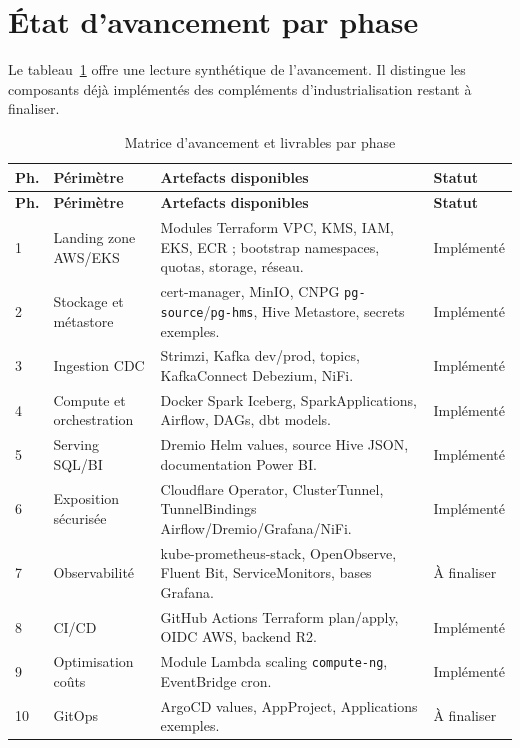 \section{État d'avancement par phase}

Le tableau~\ref{tab:avancement} offre une lecture synthétique de l'avancement. Il distingue les composants déjà implémentés des compléments d'industrialisation restant à finaliser.

\begin{longtable}{@{}p{}p{}p{}p{}@{}}
\caption{Matrice d'avancement et livrables par phase}
\label{tab:avancement}\\
\toprule
\textbf{Ph.} & \textbf{Périmètre} & \textbf{Artefacts disponibles} & \textbf{Statut} \\
\midrule
\endfirsthead
\toprule
\textbf{Ph.} & \textbf{Périmètre} & \textbf{Artefacts disponibles} & \textbf{Statut} \\
\midrule
\endhead
1 & Landing zone AWS/EKS & Modules Terraform VPC, KMS, IAM, EKS, ECR ; bootstrap namespaces, quotas, storage, réseau. & Implémenté \\
2 & Stockage et métastore & cert-manager, MinIO, CNPG \texttt{pg-source}/\texttt{pg-hms}, Hive Metastore, secrets exemples. & Implémenté \\
3 & Ingestion CDC & Strimzi, Kafka dev/prod, topics, KafkaConnect Debezium, NiFi. & Implémenté \\
4 & Compute et orchestration & Docker Spark Iceberg, SparkApplications, Airflow, DAGs, dbt models. & Implémenté \\
5 & Serving SQL/BI & Dremio Helm values, source Hive JSON, documentation Power BI. & Implémenté  \\
6 & Exposition sécurisée & Cloudflare Operator, ClusterTunnel, TunnelBindings Airflow/Dremio/Grafana/NiFi. & Implémenté  \\
7 & Observabilité & kube-prometheus-stack, OpenObserve, Fluent Bit, ServiceMonitors, bases Grafana. & À finaliser \\
8 & CI/CD & GitHub Actions Terraform plan/apply, OIDC AWS, backend R2. & Implémenté \\
9 & Optimisation coûts & Module Lambda scaling \texttt{compute-ng}, EventBridge cron. & Implémenté \\
10 & GitOps & ArgoCD values, AppProject, Applications exemples. & À finaliser \\
\bottomrule
\end{longtable}

